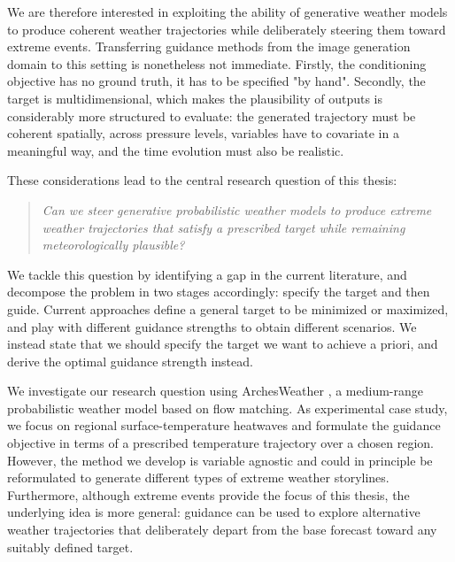 We are therefore interested in exploiting the ability of generative weather
models to produce coherent weather trajectories while deliberately steering
them toward extreme events.
Transferring guidance methods from the image generation domain to this setting is nonetheless not
immediate.
Firstly, the conditioning objective has no ground truth, it has to be specified "by hand".
Secondly, the target is multidimensional, which makes the plausibility of outputs is considerably more structured to evaluate:
the generated trajectory must be coherent spatially, across pressure levels, variables have to covariate in a meaningful way, and the time evolution must also be realistic.

These considerations lead to the central research question of this thesis:

\begin{quote}
\emph{Can we steer generative probabilistic weather models to produce extreme
weather trajectories that satisfy a prescribed target while remaining
meteorologically plausible?}
\end{quote}

We tackle this question by identifying a gap in the current literature, 
and decompose the problem in two stages accordingly: specify the target and then guide.
Current approaches define a general target to be minimized or maximized, and play with different guidance strengths to obtain different scenarios.
We instead state that we should specify the target we want to achieve a priori, 
and derive the optimal guidance strength instead.

We investigate our research question using ArchesWeather
\parencite{couairon2024archesweather}, a medium-range probabilistic weather model based on
flow matching.
As experimental case study, we focus on regional surface-temperature
heatwaves and formulate the guidance objective in terms of a prescribed
temperature trajectory over a chosen region.
However, the method we develop is variable agnostic and could in principle be reformulated to generate different types of extreme weather storylines.
Furthermore, although extreme events provide the focus of this thesis, the underlying idea
is more general: guidance can be used to explore alternative weather
trajectories that deliberately depart from the base forecast toward any
suitably defined target.

